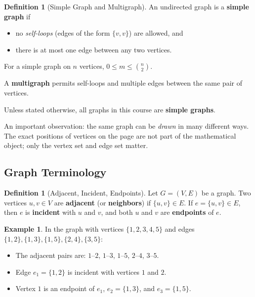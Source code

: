\documentclass[11pt, a4paper, notitlepage]{report}
\theoremstyle{definition}
\newtheorem{definition}[theorem]{Definition}
\newtheorem{example}[theorem]{Example}
\theoremstyle{remark}
\begin{document}
\begin{definition}[Simple Graph and Multigraph]
\label{def:simple-graph}
An undirected graph is a \textbf{simple graph} if
\begin{itemize}
  \item no \emph{self-loops} (edges of the form $\{v, v\}$) are allowed, and
  \item there is at most one edge between any two vertices.
\end{itemize}
For a simple graph on $n$ vertices, $0 \le m \le \binom{n}{2}$.

A \textbf{multigraph} permits self-loops and multiple edges between the same pair of vertices.
\end{definition}

\begin{warning}[title={Convention}]
  Unless stated otherwise, all graphs in this course are \textbf{simple graphs}.
\end{warning}

An important observation: the same graph can be \emph{drawn} in many different ways. The
exact positions of vertices on the page are not part of the mathematical object; only the
vertex set and edge set matter.

\subsection{Graph Terminology}
\label{subsec:graph-terminology}

\begin{definition}[Adjacent, Incident, Endpoints]
\label{def:adjacent}
Let $G = (V, E)$ be a graph. Two vertices $u, v \in V$ are \textbf{adjacent} (or
\textbf{neighbors}) if $\{u, v\} \in E$. If $e = \{u, v\} \in E$, then $e$ is
\textbf{incident} with $u$ and $v$, and both $u$ and $v$ are \textbf{endpoints} of $e$.
\end{definition}

\begin{example}
In the graph with vertices $\{1,2,3,4,5\}$ and edges $\{1,2\},\{1,3\},\{1,5\},\{2,4\},\{3,5\}$:
\begin{itemize}
  \item The adjacent pairs are: $1$--$2$, $1$--$3$, $1$--$5$, $2$--$4$, $3$--$5$.
  \item Edge $e_1 = \{1,2\}$ is incident with vertices $1$ and $2$.
  \item Vertex $1$ is an endpoint of $e_1$, $e_2 = \{1,3\}$, and $e_3 = \{1,5\}$.
\end{itemize}
\end{example}
\end{document}
